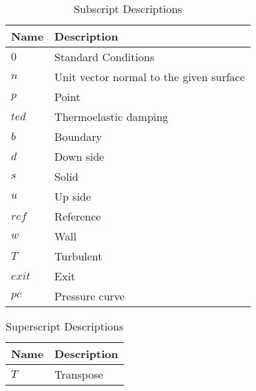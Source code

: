 \documentclass{report}
\begin{document}
\begin{table}[h]
    \caption{Variable Descriptions and Units}
    \label{tab:variables}
    \end{table}

    \begin{table}[H]
    \centering
    \begin{tabularx}{\textwidth}{AB}
    \toprule
    \textbf{Name} & \textbf{Description} \\ 
    \midrule
    \( 0 \) & Standard Conditions \\ 
    \( n \) & Unit vector normal to the given surface \\ 
    \( p \) & Point \\ 
    \( ted \) & Thermoelastic damping \\ 
    \( b \) & Boundary \\ 
    \( d \) & Down side \\ 
    \( s \) & Solid \\ 
    \( u \) & Up side \\ 
    \( ref \) & Reference \\ 
    \( w \) & Wall \\ 
    \( T \) & Turbulent \\ 
    \( exit \) & Exit \\ 
    \( pc \) & Pressure curve \\ 
    \bottomrule
    \end{tabularx}
    \caption{Subscript Descriptions}
    \label{tab:subscripts}
    \end{table}

    \begin{table}[H]
    \centering
    \begin{tabularx}{\textwidth}{AB}
    \toprule
    \textbf{Name} & \textbf{Description} \\ 
    \midrule
    \( T \) & Transpose \\ 
    \bottomrule
    \end{tabularx}
    \caption{Superscript Descriptions}
    \label{tab:superscripts}
    \end{table}
\end{document}
